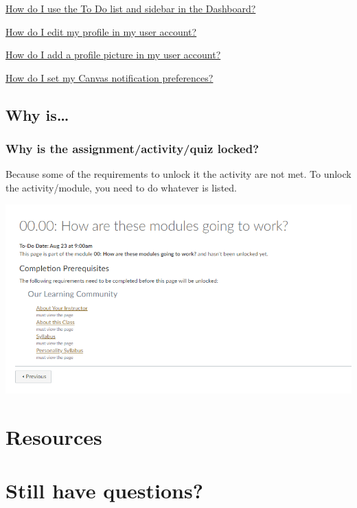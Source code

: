 \href{https://community.canvaslms.com/docs/DOC-10589-4212717407}{How do I use the To Do list and sidebar in the Dashboard?}

\href{https://community.canvaslms.com/docs/DOC-10628-4212710342}{How do I edit my profile in my user account?}

\href{https://community.canvaslms.com/docs/DOC-10599-4212710334}{How do I add a profile picture in my user account?}

\href{https://community.canvaslms.com/docs/DOC-10624-4212710344}{How do I set my Canvas notification preferences?}

\hypertarget{why-is}{%
\subsection{Why is\ldots{}}\label{why-is}}

\hypertarget{why-is-the-assignmentactivityquiz-locked}{%
\subsubsection{Why is the assignment/activity/quiz locked?}\label{why-is-the-assignmentactivityquiz-locked}}

Because some of the requirements to unlock it the activity are not met. To unlock the activity/module, you need to do whatever is listed.

\begin{center}\includegraphics[width=0.5\linewidth]{img/requirements} \end{center}

\hypertarget{resources-1}{%
\section{Resources}\label{resources-1}}

\hypertarget{still-have-questions}{%
\section{Still have questions?}\label{still-have-questions}}

